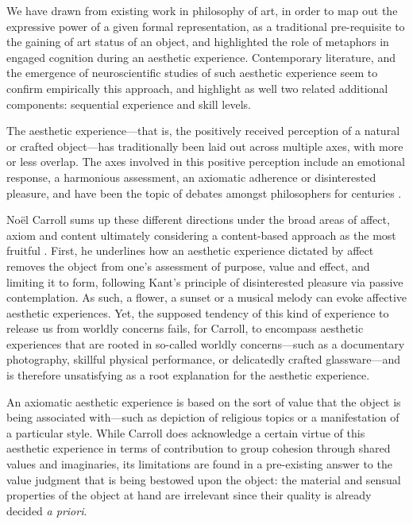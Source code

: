 We have drawn from existing work in philosophy of art, in order to map out the expressive power of a given formal representation, as a traditional pre-requisite to the gaining of art status of an object, and highlighted the role of metaphors in engaged cognition during an aesthetic experience. Contemporary literature, and the emergence of neuroscientific studies of such aesthetic experience seem to confirm empirically this approach, and highlight as well two related additional components: sequential experience and skill levels.

The aesthetic experience—that is, the positively received perception of a natural or crafted object—has traditionally been laid out across multiple axes, with more or less overlap. The axes involved in this positive perception include an emotional response, a harmonious assessment, an axiomatic adherence or disinterested pleasure, and have been the topic of debates amongst philosophers for centuries \citep{peacocke_aesthetic_2023}.

Noël Carroll sums up these different directions under the broad areas of affect, axiom and content ultimately considering a content-based approach as the most fruitful \citep{carroll_aesthetic_2002}. First, he underlines how an aesthetic experience dictated by affect removes the object from one's assessment of purpose, value and effect, and limiting it to form, following Kant's principle of disinterested pleasure via passive contemplation. As such, a flower, a sunset or a musical melody can evoke affective aesthetic experiences. Yet, the supposed tendency of this kind of experience to release us from worldly concerns fails, for Carroll, to encompass aesthetic experiences that are rooted in so-called worldly concerns—such as a documentary photography, skillful physical performance, or delicatedly crafted glassware—and is therefore unsatisfying as a root explanation for the aesthetic experience.

An axiomatic aesthetic experience is based on the sort of value that the object is being associated with—such as depiction of religious topics or a manifestation of a particular style. While Carroll does acknowledge a certain virtue of this aesthetic experience in terms of contribution to group cohesion through shared values and imaginaries, its limitations are found in a pre-existing answer to the value judgment that is being bestowed upon the object: the material and sensual properties of the object at hand are irrelevant since their quality is already decided \emph{a priori}.

